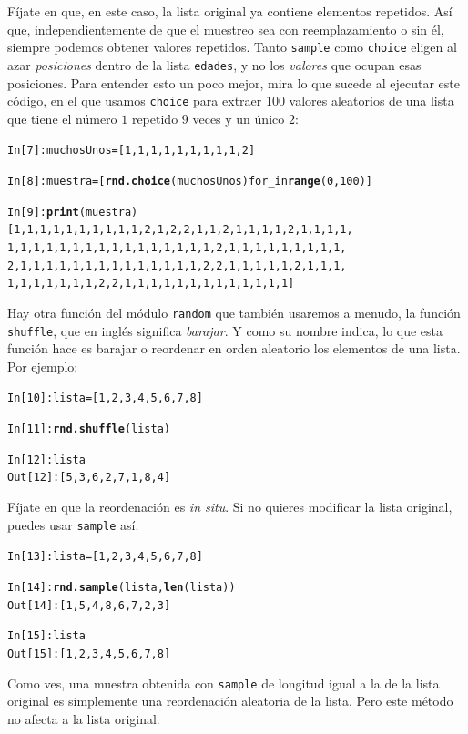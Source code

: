\documentclass[10pt,a4paper]{article}\usepackage[]{graphicx}\usepackage[]{color}
\makeatletter
\newcommand{\hlkwd}[1]{\textcolor[rgb]{0.737,0.353,0.396}{\textbf{#1}}}%
\newenvironment{kframe}{%
 \def\at@end@of@kframe{}%
 \ifinner\ifhmode%
  \def\at@end@of@kframe{\end{minipage}}%
  \begin{minipage}{\columnwidth}%
 \fi\fi%
 \def\FrameCommand##1{\hskip\@totalleftmargin \hskip-\fboxsep
 \colorbox{shadecolor}{##1}\hskip-\fboxsep
     \hskip-\linewidth \hskip-\@totalleftmargin \hskip\columnwidth}%
 \MakeFramed {\advance\hsize-\width
   \@totalleftmargin\z@ \linewidth\hsize
   \@setminipage}}%
 {\par\unskip\endMakeFramed%
 \at@end@of@kframe}
\newenvironment{knitrout}{}{} %
\newcounter {cont01}
\makeatother
\begin{document}
Fíjate en que, en este caso, la lista original ya contiene elementos repetidos. Así que, independientemente de que el muestreo sea con reemplazamiento o sin él, siempre podemos obtener valores repetidos. Tanto {\tt sample} como {\tt choice} eligen al azar {\em posiciones} dentro de la lista {\tt edades}, y no los {\em valores} que ocupan esas posiciones.  Para entender esto un poco mejor, mira lo que sucede al ejecutar este código, en el que usamos {\tt choice} para extraer 100 valores aleatorios de una lista que tiene el número $1$ repetido $9$ veces y un único $2$:
\begin{knitrout}
\color{fgcolor}\begin{kframe}
\begin{alltt}
In [7]: muchosUnos = [1,1,1,1,1,1,1,1,1,2]

In [8]: muestra = [\hlkwd{rnd.choice}(muchosUnos) for _ in \hlkwd{range}(0, 100)]

In [9]: \hlkwd{print}(muestra)
[1, 1, 1, 1, 1, 1, 1, 1, 1, 1, 2, 1, 2, 2, 1, 1, 2, 1, 1, 1, 1, 2, 1, 1, 1, 1,
1, 1, 1, 1, 1, 1, 1, 1, 1, 1, 1, 1, 1, 1, 1, 1, 2, 1, 1, 1, 1, 1, 1, 1, 1, 1,
2, 1, 1, 1, 1, 1, 1, 1, 1, 1, 1, 1, 1, 1, 1, 2, 2, 1, 1, 1, 1, 1, 2, 1, 1, 1,
1, 1, 1, 1, 1, 1, 1, 2, 2, 1, 1, 1, 1, 1, 1, 1, 1, 1, 1, 1, 1, 1]
\end{alltt}
\end{kframe}
\end{knitrout}
Hay otra función del módulo {\tt random} que también usaremos a menudo, la función {\tt shuffle}, que en inglés significa {\em barajar}. Y como su nombre indica, lo que esta función hace es barajar o reordenar en orden aleatorio los elementos de una lista. Por ejemplo:
\begin{knitrout}
\color{fgcolor}\begin{kframe}
\begin{alltt}
In [10]: lista = [1, 2, 3, 4, 5, 6, 7, 8]

In [11]: \hlkwd{rnd.shuffle}(lista)

In [12]: lista
Out[12]: [5, 3, 6, 2, 7, 1, 8, 4]
\end{alltt}
\end{kframe}
\end{knitrout}
Fíjate en que la reordenación es {\em in situ}. Si no quieres modificar la lista original, puedes usar {\tt sample} así:
\begin{knitrout}
\color{fgcolor}\begin{kframe}
\begin{alltt}
In [13]: lista = [1, 2, 3, 4, 5, 6, 7, 8]

In [14]: \hlkwd{rnd.sample}(lista, \hlkwd{len}(lista))
Out[14]: [1, 5, 4, 8, 6, 7, 2, 3]

In [15]: lista
Out[15]: [1, 2, 3, 4, 5, 6, 7, 8]
\end{alltt}
\end{kframe}
\end{knitrout}
Como ves, una muestra obtenida con {\tt sample} de longitud igual a la de la lista original es simplemente una reordenación aleatoria de la lista. Pero este método no afecta a la lista original.
\end{document}
